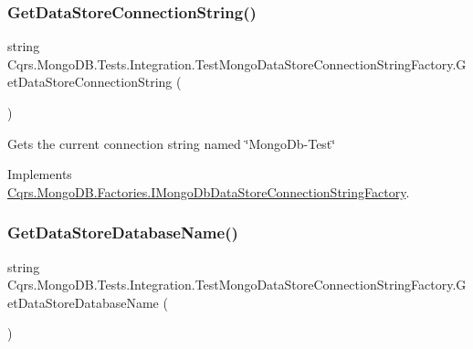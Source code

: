 \subsubsection{\texorpdfstring{Get\+Data\+Store\+Connection\+String()}{GetDataStoreConnectionString()}}
{\footnotesize\ttfamily string Cqrs.\+Mongo\+D\+B.\+Tests.\+Integration.\+Test\+Mongo\+Data\+Store\+Connection\+String\+Factory.\+Get\+Data\+Store\+Connection\+String (\begin{DoxyParamCaption}{ }\end{DoxyParamCaption})}



Gets the current connection string named \char`\"{}\+Mongo\+Db-\/\+Test\char`\"{} 



Implements \hyperlink{interfaceCqrs_1_1MongoDB_1_1Factories_1_1IMongoDbDataStoreConnectionStringFactory_a31cb87fb2cf1435912f635394494ed91_a31cb87fb2cf1435912f635394494ed91}{Cqrs.\+Mongo\+D\+B.\+Factories.\+I\+Mongo\+Db\+Data\+Store\+Connection\+String\+Factory}.

\mbox{\label{classCqrs_1_1MongoDB_1_1Tests_1_1Integration_1_1TestMongoDataStoreConnectionStringFactory_a1f362a8cdae3f0fb7b8a51f62f7611f3_a1f362a8cdae3f0fb7b8a51f62f7611f3}} 
\subsubsection{\texorpdfstring{Get\+Data\+Store\+Database\+Name()}{GetDataStoreDatabaseName()}}
{\footnotesize\ttfamily string Cqrs.\+Mongo\+D\+B.\+Tests.\+Integration.\+Test\+Mongo\+Data\+Store\+Connection\+String\+Factory.\+Get\+Data\+Store\+Database\+Name (\begin{DoxyParamCaption}{ }\end{DoxyParamCaption})}



